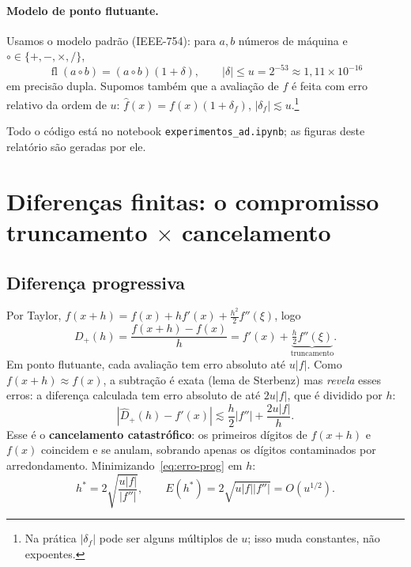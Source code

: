 \documentclass[11pt,a4paper]{article}
\newcommand{\fl}{\operatorname{fl}}
\begin{document}
\paragraph{Modelo de ponto flutuante.} Usamos o modelo padrão (IEEE-754): para $a,b$ números de máquina e $\circ\in\{+,-,\times,/\}$,
\begin{equation}
\fl(a\circ b) = (a\circ b)(1+\delta), \qquad |\delta|\le u = 2^{-53}\approx 1{,}11\times 10^{-16}
\end{equation}
em precisão dupla. Supomos também que a avaliação de $f$ é feita com erro relativo da ordem de $u$: $\hat f(x) = f(x)(1+\delta_f)$, $|\delta_f|\lesssim u$.\footnote{Na prática $|\delta_f|$ pode ser alguns múltiplos de $u$; isso muda constantes, não expoentes.}

Todo o código está no notebook \texttt{experimentos\_ad.ipynb}; as figuras deste relatório são geradas por ele.

\section{Diferenças finitas: o compromisso truncamento $\times$ cancelamento}
\label{sec:fd}

\subsection{Diferença progressiva}
Por Taylor, $f(x+h) = f(x) + hf'(x) + \tfrac{h^2}{2}f''(\xi)$, logo
\begin{equation}
D_+(h) = \frac{f(x+h)-f(x)}{h} = f'(x) + \underbrace{\tfrac{h}{2}f''(\xi)}_{\text{truncamento}} .
\end{equation}
Em ponto flutuante, cada avaliação tem erro absoluto até $u|f|$. Como $f(x+h)\approx f(x)$, a subtração é exata (lema de Sterbenz) mas \emph{revela} esses erros: a diferença calculada tem erro absoluto de até $2u|f|$, que é dividido por $h$:
\begin{equation}
|\hat D_+(h) - f'(x)| \lesssim \frac{h}{2}|f''| + \frac{2u|f|}{h} .
\label{eq:erro-prog}
\end{equation}
Esse é o \textbf{cancelamento catastrófico}: os primeiros dígitos de $f(x+h)$ e $f(x)$ coincidem e se anulam, sobrando apenas os dígitos contaminados por arredondamento. Minimizando~\eqref{eq:erro-prog} em $h$:
\begin{equation}
h^\ast = 2\sqrt{\frac{u|f|}{|f''|}}, \qquad E(h^\ast) = 2\sqrt{u|f||f''|} = O(u^{1/2}).
\end{equation}
\end{document}
